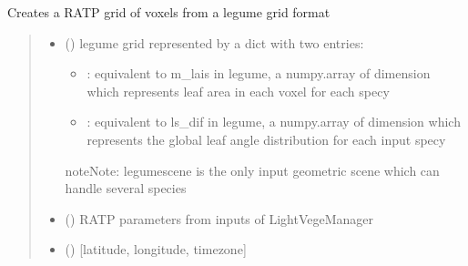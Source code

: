 \documentclass[letterpaper,10pt,english]{sphinxmanual}
\begin{document}

\begin{fulllineitems}
\label{\detokenize{reference:buildRATPscene.legumescene_to_RATPscene}}
\pysigstartsignatures
{}
\pysigstopsignatures
\sphinxAtStartPar
Creates a RATP grid of voxels from a l\sphinxhyphen{}egume grid format
\begin{quote}\begin{description}
\begin{itemize}
\item {} 
\sphinxAtStartPar
{} () \textendash{} 
\sphinxAtStartPar
l\sphinxhyphen{}egume grid represented by a dict with two entries:
\begin{itemize}
\item {} 
\sphinxAtStartPar
{}: equivalent to m\_lais in l\sphinxhyphen{}egume, a numpy.array of dimension  which represents leaf area in each voxel for each specy

\item {} 
\sphinxAtStartPar
{}: equivalent to ls\_dif in l\sphinxhyphen{}egume, a numpy.array of dimension  which represents the global leaf angle distribution for each input specy

\end{itemize}

\begin{sphinxadmonition}{note}{Note:}
\sphinxAtStartPar
legumescene is the only input geometric scene which can handle several species
\end{sphinxadmonition}


\item {} 
\sphinxAtStartPar
{} () \textendash{} RATP parameters from inputs of LightVegeManager

\item {} 
\sphinxAtStartPar
{} () \textendash{} {[}latitude, longitude, timezone{]}


\end{itemize}
\end{description}
\end{quote}
\end{fulllineitems}
\end{document}
